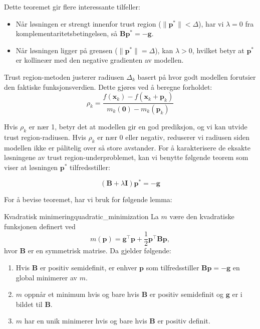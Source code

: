 Dette teoremet gir flere interessante tilfeller:
\begin{itemize}
	\item Når løsningen er strengt innenfor trust region ($\|\symbf{p}^\ast\| < \Delta$), har vi $\lambda = 0$ fra komplementaritetsbetingelsen, så $\symbf{B}\symbf{p}^\ast = -\symbf{g}$.
	\item Når løsningen ligger på grensen ($\|\symbf{p}^\ast\| = \Delta$), kan $\lambda > 0$, hvilket betyr at $\symbf{p}^\ast$ er kollineær med den negative gradienten av modellen.
\end{itemize}

Trust region-metoden justerer radiusen $\Delta_k$ basert på hvor godt modellen forutsier den faktiske funksjonsverdien. Dette gjøres ved å beregne forholdet:
\[
	\rho_k = \frac{f(\symbf{x}_k) - f(\symbf{x}_k + \symbf{p}_k)}{m_k(\symbf{0}) - m_k(\symbf{p}_k)}
\]

Hvis $\rho_k$ er nær 1, betyr det at modellen gir en god prediksjon, og vi kan utvide trust region-radiusen. Hvis $\rho_k$ er nær 0 eller negativ, reduserer vi radiusen siden modellen ikke er pålitelig over så store avstander.
For å karakterisere de eksakte løsningene av trust region-underproblemet, kan vi benytte følgende teorem som viser at løsningen $\symbf{p}^\ast$ tilfredsstiller:

\[
	(\symbf{B} + \lambda \symbf{I})\symbf{p}^\ast = -\symbf{g}
\]

For å bevise teoremet, har vi bruk for følgende lemma:

\begin{lemma}{Kvadratisk minimering}{quadratic_minimization}
	La \(m\) være den kvadratiske funksjonen definert ved
	\[
		m(\symbf{p}) = \symbf{g}^\top \symbf{p} + \frac{1}{2} \symbf{p}^\top \symbf{B}\symbf{p},
	\]
	hvor \(\symbf{B}\) er en symmetrisk matrise. Da gjelder følgende:
	\begin{enumerate}
		\item Hvis \(\symbf{B}\) er positiv semidefinit, er enhver \(\symbf{p}\) som tilfredsstiller \(\symbf{B}\symbf{p} = -\symbf{g}\) en global minimerer av \(m\).
		\item \(m\) oppnår et minimum hvis og bare hvis \(\symbf{B}\) er positiv semidefinit og \(\symbf{g}\) er i bildet til \(\symbf{B}\).
		\item \(m\) har en unik minimerer hvis og bare hvis \(\symbf{B}\) er positiv definit.
	\end{enumerate}
\end{lemma}

